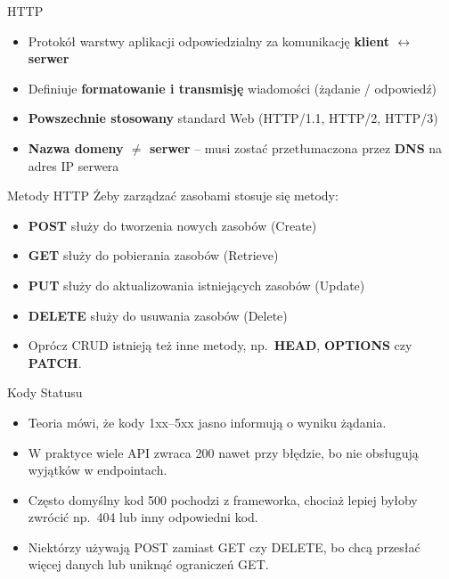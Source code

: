 \documentclass[10pt,compress,usenames,dvipsnames,aspectratio=169]{beamer}
\begin{document}
\begin{frame}{HTTP}
  \begin{itemize}
    \item Protokół warstwy aplikacji odpowiedzialny za komunikację \textbf{klient $\leftrightarrow$ serwer}
    \item Definiuje \textbf{formatowanie i transmisję} wiadomości (żądanie / odpowiedź)
    \item \textbf{Powszechnie stosowany} standard Web (HTTP/1.1, HTTP/2, HTTP/3)
    \item \textbf{Nazwa domeny $\neq$ serwer} – musi zostać przetłumaczona przez \textbf{DNS} na adres IP serwera
  \end{itemize}
  
\end{frame}


\begin{frame}{Metody HTTP}
Żeby zarządzać zasobami stosuje się metody:
  \vspace{1ex}

  \begin{itemize}
    \item \textbf{POST} służy do tworzenia nowych zasobów (Create)
    \item \textbf{GET} służy do pobierania zasobów (Retrieve)
    \item \textbf{PUT} służy do aktualizowania istniejących zasobów (Update)
    \item \textbf{DELETE} służy do usuwania zasobów (Delete)
    \item Oprócz CRUD istnieją też inne metody, np.\ \textbf{HEAD}, \textbf{OPTIONS} czy \textbf{PATCH}.
  \end{itemize}
 
\end{frame}

\begin{frame}{Kody Statusu}

  \begin{itemize}
    \item Teoria mówi, że kody 1xx–5xx jasno informują o wyniku żądania.
    \item W praktyce wiele API zwraca 200 nawet przy błędzie, bo nie obsługują wyjątków w endpointach.
    \item Często domyślny kod 500 pochodzi z frameworka, chociaż lepiej byłoby zwrócić np.\ 404 lub inny odpowiedni kod.
    \item Niektórzy używają POST zamiast GET czy DELETE, bo chcą przesłać więcej danych lub uniknąć ograniczeń GET.
  \end{itemize}
\end{frame}
\end{document}
